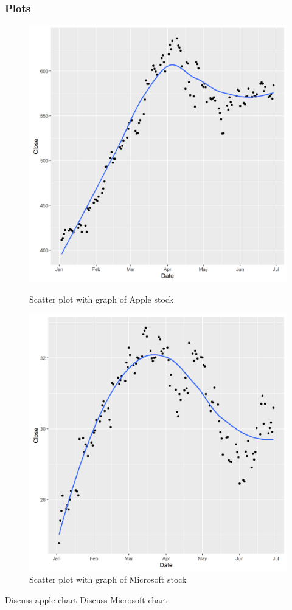 \documentclass[paper=a4, fontsize=11pt]{scrartcl} %
\numberwithin{equation}{section} %
\numberwithin{figure}{section} %
\numberwithin{table}{section} %
\begin{document}
\subsubsection{Plots}
\begin{figure}[!htb]
  \includegraphics[width=\linewidth]{graph/AAPL3.png}
  \caption{Scatter plot with graph of Apple stock}
\endminipage\hfill
{}
  \includegraphics[width=\linewidth]{graph/MSFT3.png}
  \caption{Scatter plot with graph of Microsoft stock}
\endminipage\hfill

\end{figure}
Discuss apple chart
Discuss Microsoft chart
\end{document}
